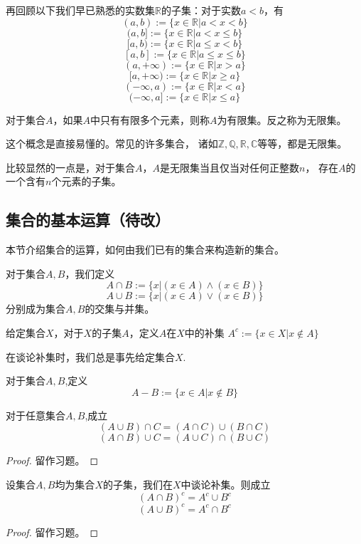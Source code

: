 \begin{example}[开区间与闭区间]
再回顾以下我们早已熟悉的实数集$\mathbb{R}$的子集：对于实数$a<b$，有
$$(a,b):=\{x\in\mathbb{R}|a<x<b\}$$
$$(a,b]:=\{x\in\mathbb{R}|a<x\leq b\}$$
$$[a,b):=\{x\in\mathbb{R}|a\leq x<b\}$$
$$[a,b]:=\{x\in\mathbb{R}|a\leq x\leq b\}$$
$$(a,+\infty):=\{x\in\mathbb{R}|x>a\}$$
$$[a,+\infty):=\{x\in\mathbb{R}|x\geq a\}$$
$$(-\infty,a):=\{x\in\mathbb{R}|x<a\}$$
$$(-\infty,a]:=\{x\in\mathbb{R}|x\leq a\}$$
\end{example}

\begin{definition}[有限集与无限集]
对于集合$A$，如果$A$中只有有限多个元素，则称$A$为有限集。反之称为无限集。
\end{definition}
这个概念是直接易懂的。常见的许多集合，
诸如$\mathbb{Z},\mathbb{Q},\mathbb{R},\mathbb{C}$等等，都是无限集。

比较显然的一点是，对于集合$A$，$A$是无限集当且仅当对任何正整数$n$，
存在$A$的一个含有$n$个元素的子集。

\subsection{集合的基本运算（待改）}

本节介绍集合的运算，如何由我们已有的集合来构造新的集合。
\begin{definition}[集合的交、并]
对于集合$A,B$，我们定义
$$A\cap B:=\{x|(x\in A)\wedge(x\in B)\}$$
$$A\cup B:=\{x|(x\in A)\vee(x\in B)\}$$
分别成为集合$A,B$的交集与并集。
\end{definition}

\begin{definition}[补集]
给定集合$X$，对于$X$的子集$A$，定义$A$在$X$中的补集
$A^c:=\{x\in X|x\not\in A\}$
\end{definition}
在谈论补集时，我们总是事先给定集合$X$.

\begin{definition}[差集]
对于集合$A,B$,定义
$$A-B:=\{x\in A|x\not\in B\}$$
\end{definition}

\begin{prop}[交、并的分配律]\label{set-fenpeilv}
对于任意集合$A,B$,成立
$$(A\cup B)\cap C=(A\cap C)\cup(B\cap C)$$
$$(A\cap B)\cup C=(A\cup C)\cap(B\cup C)$$
\end{prop}
\begin{proof}
留作习题。
\end{proof}

\begin{prop}[摩根律]\label{set-morgen}
设集合$A,B$均为集合$X$的子集，我们在$X$中谈论补集。则成立
$$(A\cap B)^c=A^c\cup B^c$$
$$(A\cup B)^c=A^c\cap B^c$$
\end{prop}
\begin{proof}
留作习题。
\end{proof}

